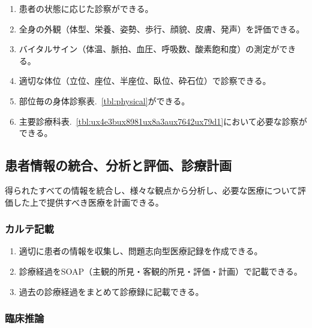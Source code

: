 \begin{enumerate}
\def\labelenumi{\arabic{enumi}.}
\tightlist
\item
  患者の状態に応じた診察ができる。
\item
  全身の外観（体型、栄養、姿勢、歩行、顔貌、皮膚、発声）を評価できる。
\item
  バイタルサイン（体温、脈拍、血圧、呼吸数、酸素飽和度）の測定ができる。
\item
  適切な体位（立位、座位、半座位、臥位、砕石位）で診察できる。
\item
  部位毎の身体診察表.~\ref{tbl:physical}ができる。
\item
  主要診療科表.~\ref{tbl:ux4e3bux8981ux8a3aux7642ux79d1}において必要な診察ができる。
\end{enumerate}

\hypertarget{ux60a3ux8005ux60c5ux5831ux306eux7d71ux5408ux5206ux6790ux3068ux8a55ux4fa1ux8a3aux7642ux8a08ux753b}{%
\subsection{患者情報の統合、分析と評価、診療計画}\label{ux60a3ux8005ux60c5ux5831ux306eux7d71ux5408ux5206ux6790ux3068ux8a55ux4fa1ux8a3aux7642ux8a08ux753b}}

得られたすべての情報を統合し、様々な観点から分析し、必要な医療について評価した上で提供すべき医療を計画できる。

\hypertarget{ux30abux30ebux30c6ux8a18ux8f09}{%
\subsubsection{カルテ記載}\label{ux30abux30ebux30c6ux8a18ux8f09}}

\begin{enumerate}
\def\labelenumi{\arabic{enumi}.}
\tightlist
\item
  適切に患者の情報を収集し、問題志向型医療記録を作成できる。
\item
  診療経過をSOAP（主観的所見・客観的所見・評価・計画）で記載できる。
\item
  過去の診療経過をまとめて診療録に記載できる。
\end{enumerate}

\hypertarget{ux81e8ux5e8aux63a8ux8ad6}{%
\subsubsection{臨床推論}\label{ux81e8ux5e8aux63a8ux8ad6}}

